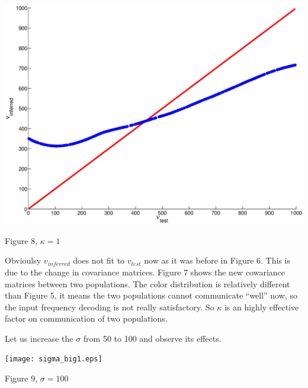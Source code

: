 \documentclass{article}
\begin{document}
\begin{center}
\includegraphics[width=\textwidth]{kappa.eps}
\begin{footnotesize}
 Figure 8, $\kappa=1$
\end{footnotesize}
\end{center}

Obvioulsy $v_{inferred}$ does not fit to $v_{test}$ now as it was before in Figure 6. This is due to the change in covariance matrices. Figure 7 shows the new cowariance matrices between two populations. The color distribution is relatively different than Figure 5, it means the two populations cannot communicate ``well'' now, so the input frequency decoding is not really satisfactory. So $\kappa$ is an highly effective factor on communication of two populations. 

Let us increase the $\sigma$ from 50 to 100 and observe its effects.

\begin{center}
\texttt{[image: sigma\_big1.eps]}
\begin{footnotesize}
 Figure 9, $\sigma=100$
\end{footnotesize}
\end{center}
\end{document}
